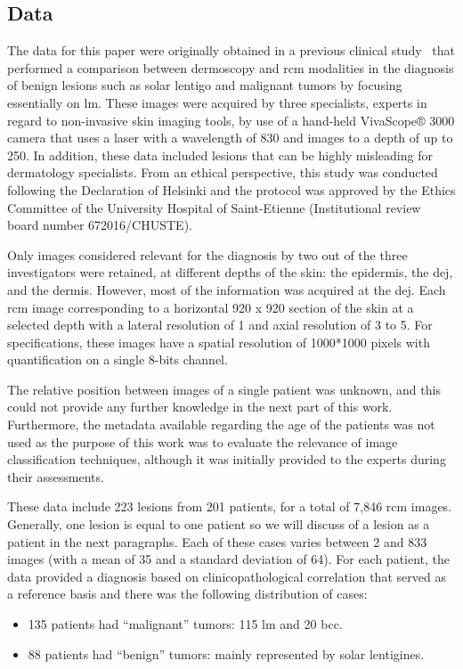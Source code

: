 \documentclass[journal,article,accept,moreauthors,pdftex, applsci]{Definitions/mdpi}
\begin{document}
\subsection{Data}
\label{sec:data}
The data for this paper were originally obtained in a previous clinical study~\cite{Cinotti2018} that performed a comparison between dermoscopy and \ac{rcm} modalities in the diagnosis of benign lesions such as solar lentigo and malignant tumors by focusing essentially on \ac{lm}. These images were acquired by three specialists, experts in regard to non-invasive skin imaging tools, by use of a hand-held VivaScope® 3000 camera that uses a laser with a wavelength of \unit{830}{\nano\meter} and images to a depth of up to \unit{250}{\micro\meter}. In addition, these data included lesions that can be highly misleading for dermatology specialists. From an ethical perspective, this study was conducted following the Declaration of Helsinki and the protocol was approved by the Ethics Committee of the University Hospital of Saint-Etienne (Institutional review board number 672016/CHUSTE).\par
Only images considered relevant for the diagnosis by two out of the three investigators were retained, at different depths of the skin: the epidermis, the \ac{dej}, and the dermis. However, most of the information was acquired at the \ac{dej}. Each \ac{rcm} image corresponding to a horizontal \unit{920}{\micro\meter} x \unit{920}{\micro\meter} section of the skin at a selected depth with a lateral resolution of \unit{1}{\micro\meter} and axial resolution of \unit{3}{\micro\meter} to \unit{5}{\micro\meter}. For specifications, these images have a spatial resolution of 1000*1000 pixels with quantification on a single 8-bits channel.\par
The relative position between images of a single patient was unknown, and this could not provide any further knowledge in the next part of this work. Furthermore, the metadata available regarding the age of the patients was not used as the purpose of this work was to evaluate the relevance of image classification techniques, although it was initially provided to the experts during their assessments.\par
These data include 223 lesions from 201 patients, for a total of 7,846 \ac{rcm} images. Generally, one lesion is equal to one patient so we will discuss of a lesion as a patient in the next paragraphs. Each of these cases varies between 2 and 833 images (with a mean of 35 and a standard deviation of 64). For each patient, the data provided a diagnosis based on clinicopathological correlation that served as a reference basis and there was the following distribution of cases:
\begin{itemize}
\item 135 patients had “malignant” tumors: 115 \ac{lm} and 20 \ac{bcc}.
\item 88 patients had “benign” tumors: mainly represented by solar lentigines.
\end{itemize}\par
\end{document}
